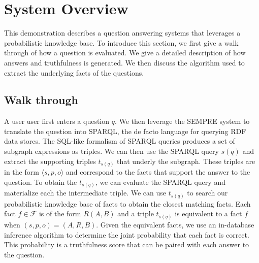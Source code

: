 
\section{System Overview}

This demonstration describes a question answering systems that leverages a probabilistic knowledge base.
To introduce this section, we first give a walk through of how a question is evaluated.
We give a detailed description of how answers and truthfulness is generated.
We then discuss the algorithm used to extract the underlying facts of the questions.




\subsection{Walk through}
\label{sec:probqa-walkthrough}
A user user first enters a question \(q\). 
We then leverage the SEMPRE system to translate the question into SPARQL, the de facto language for querying RDF data stores.
The  SQL-like formalism of SPARQL queries produces a set of subgraph expressions as triples.
We can then use the SPARQL query $s(q)$ and extract the supporting triples \(t_{s(q)}\) that underly the subgraph.
These triples are in the form \(\langle s, p, o \rangle\) and correspond to the facts that support the answer to the question.
To obtain the \(t_{s(q)}\), we can evaluate the SPARQL query and materialize each the intermediate triple.
We can use \(t_{s(q)}\) to search our probabilistic knowledge base of facts to obtain the closest matching facts.
Each fact \(f \in \mathcal{F}\) is of the form \(R(A,B)\) and a triple \(t_{s(q)}\) is equivalent to a fact \(f\) when 
\( (s,p,o) = (A,R,B) \).
Given the equivalent facts, we use an in-database inference algorithm to determine the joint probability that each fact is correct.
This probability is a truthfulness score that can be paired with each answer to the question.



